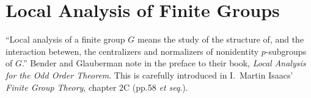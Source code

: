 \section{Local Analysis of Finite Groups}

``Local analysis of a finite group $G$ means the study of the structure
of, and the interaction betewen, the centralizers and normalizers of
nonidentity $p$-subgroups of $G$.'' Bender and Glauberman note in the
preface to their book, \emph{Local Analysis for the Odd Order Theorem}.
This is carefully introduced in I.~Martin Isaacs' \emph{Finite Group Theory},
chapter 2C (pp.58 \emph{et seq}.).